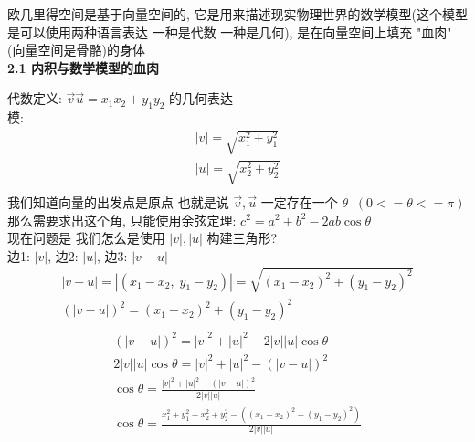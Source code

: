 \documentclass[12pt]{article}
\begin{document}
\begin{flushleft}
\begin{itemize}
              欧几里得空间是基于向量空间的, 它是用来描述现实物理世界的数学模型(这个模型是可以使用两种语言表达 一种是代数 一种是几何), 是在向量空间上填充 "血肉" (向量空间是骨骼)的身体 \\

              \vspace{0.3em}
              \textbf{2.1 内积与数学模型的血肉}

              代数定义:  $\vec{v}\vec{u} = x_{1}x_{2} + y_{1}y_{2}$ 的几何表达\\
              模:
              \begin{align}
                  |v| = \sqrt{x_{1}^{2} + y_{1}^{2}} \\
                  |u| = \sqrt{x_{2}^{2} + y_{2}^{2}} \\
              \end{align}
              我们知道向量的出发点是原点 也就是说 $\vec{v},\vec{u}$ 一定存在一个 $\theta \;\; (0 <= \theta<=\pi)$ \\
              那么需要求出这个角, 只能使用余弦定理:
              $c^{2} = a^{2} + b^{2} - 2ab \cos \theta$ \\
              现在问题是 我们怎么是使用 $|v|, |u|$ 构建三角形? \\
              边1: $|v|$, 边2: $|u|$, 边3: $|v - u|$  \\
              \begin{align}
                  |v - u| =  |(x_{1}-x_{2}, \; y_{1}- y_{2})| = \sqrt{(x_{1} - x_{2})^{2} + (y_{1}- y_{2})^{2}} \\
                  (|v - u|)^{2}  = (x_{1} - x_{2})^{2} + (y_{1}- y_{2})^{2}                                     \\
              \end{align}
              \begin{align}
                  (|v - u|)^{2} = |v|^{2}  + |u|^{2} - 2|v||u| \cos\theta                                                                \\
                  2|v||u| \cos\theta  =  |v|^{2}  + |u|^{2} -  (|v - u|)^{2}                                                             \\
                  \cos\theta = \frac{|v|^{2}  + |u|^{2} -  (|v - u|)^{2}}{2|v||u|}                                                       \\
                  \cos\theta = \frac{x_{1}^{2} + y_{1}^{2} + x_{2}^{2} + y_{2}^{2} -((x_{1} - x_{2})^{2} + (y_{1}- y_{2})^{2})}{2|v||u|} \\

\end{align}
\end{itemize}
\end{flushleft}
\end{document}
